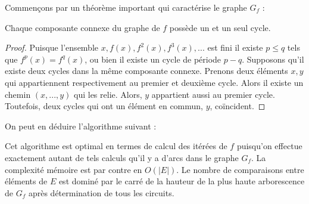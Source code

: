 Commen\c cons par un th\'eor\`eme important qui caract\'erise le graphe $G_f$ :

\begin{thm}\label{thmcycle}
Chaque composante connexe du graphe de $f$ poss\`ede un et un seul cycle.
\end{thm}
\begin{proof}
Puisque l'ensemble $x, f(x), f^2(x), f^3(x), ... $ est fini il existe $p \leqslant q$ tels que $f^p(x) = f^q(x)$, ou bien il existe un cycle de p\'eriode $p-q$.\newline
Supposons qu'il existe deux cycles dans la même composante connexe. Prenons deux \'el\'ements $x,y$ qui appartiennent respectivement au premier et deuxi\`eme cycle. Alors il existe un chemin $(x,...,y)$ qui les relie. Alors, $y$ appartient aussi au premier cycle. Toutefois, deux cycles qui ont un \'el\'ement en commun, $y$, co\"incident.
\end{proof}

On peut en d\'eduire l'algorithme suivant :\clearpage


\begin{alg}\label{alg1}
\begin{algorithm}[H]
\BlankLine
{}
\end{algorithm}
\end{alg}

\clearpage
\begin{csq}
Cet algorithme est optimal en termes de calcul des it\'er\'ees de $f$ puisqu'on effectue exactement autant de tels calculs qu'il y a d'arcs dans le graphe $G_f$. La complexit\'e m\'emoire est par contre en $O(|E|)$. Le nombre de comparaisons entre \'el\'ements de $E$ est domin\'e par le carr\'e de la hauteur de la plus haute arborescence de $G_f$ apr\`es d\'etermination de tous les circuits.
\end{csq}

